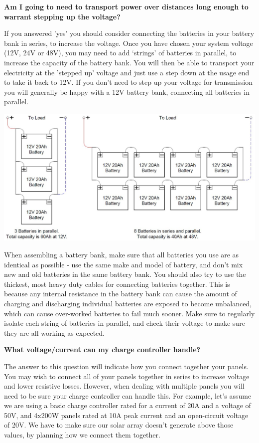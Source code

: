 \documentclass{article}
\theoremstyle{definition}
\theoremstyle{definition}
\theoremstyle{remark}
\begin{document}
  \textbf{Am I going to need to transport power over distances long enough to warrant stepping up the voltage?}

  If you answered 'yes' you should consider connecting the batteries in your battery bank in series, to increase the voltage. Once you have chosen your system voltage (12V, 24V or 48V), you may need to add ‘strings’ of batteries in parallel, to increase the capacity of the battery bank. You will then be able to transport your electricity at the 'stepped up' voltage and just use a step down at the usage end to take it back to 12V. If you don't need to step up your voltage for transmission you will generally be happy with a 12V battery bank, connecting all batteries in parallel.

  \begin{center}
    \includegraphics[width=0.75\paperwidth]{Images/image_13_1_(whole_system_1).png}
  \end{center}

  When assembling a battery bank, make sure that all batteries you use are as identical as possible - use the same make and model of battery, and don’t mix new and old batteries in the same battery bank. You should also try to use the thickest, most heavy duty cables for connecting batteries together. This is because any internal resistance in the battery bank can cause the amount of charging and discharging individual batteries are exposed to become unbalanced, which can cause over-worked batteries to fail much sooner. Make sure to regularly isolate each string of batteries in parallel, and check their voltage to make sure they are all working as expected. 

  \textbf{What voltage/current can my charge controller handle?}

  The answer to this question will indicate how you connect together your panels. You may wish to connect all of your panels together in series to increase voltage and lower resistive losses. However, when dealing with multiple panels you will need to be sure your charge controller can handle this. For example, let’s assume we are using a basic charge controller rated for a current of 20A and a voltage of 50V, and 4x200W panels rated at 10A peak current and an open-circuit voltage of 20V. We have to make sure our solar array doesn’t generate above those values, by planning how we connect them together.
  
\end{document}

